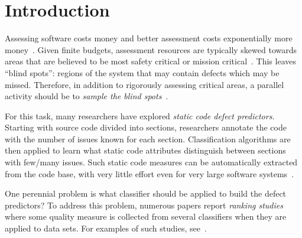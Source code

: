 \documentclass[10pt,conference]{IEEEtran}
\theoremstyle{break}
\theoremstyle{break}
\begin{document}
\IEEEpeerreviewmaketitle


\section{Introduction}
Assessing software costs money and better assessment costs exponentially more money~\cite{voas95,fu2016tuning}.  
Given finite budgets, assessment resources are typically skewed towards areas that are believed to be most safety critical or mission critical~\cite{lowryBK98}. This leaves ``blind spots'': regions of the system that may contain defects which may be missed. Therefore, in addition to rigorously assessing  critical areas, a parallel activity should be to {\em sample the blind spots}~\cite{Menzies04}. 

For this task, many researchers have explored  {\em static code defect predictors}.
Starting with source code divided into sections, researchers annotate the code with the number of issues known for each section.
Classification algorithms are then applied to learn what static code attributes
distinguish 
between sections with few/many issues.
Such static code measures can be automatically extracted from
the code base, with very little effort even for very large software
systems~\cite{Nagappan:2005}.  


One perennial problem   is what classifier should be applied to build the defect predictors?
To address this problem, numerous papers report {\em ranking studies} where
some quality measure  is collected from  several  classifiers when they are 
 applied to data sets.
For examples of such studies,
see~\cite{lessmann2008benchmarking,hall2012systematic,elish2008predicting,menzies2010defect,gondra2008applying,radjenovic2013software,jiang2008techniques,wang2013using,mende2009revisiting,li2012sample,khoshgoftaar2010attribute,jiang2009variance,ghotra2015revisiting,jiang2008can,tantithamthavorn2016automated,fu2016tuning}.
\end{document}
